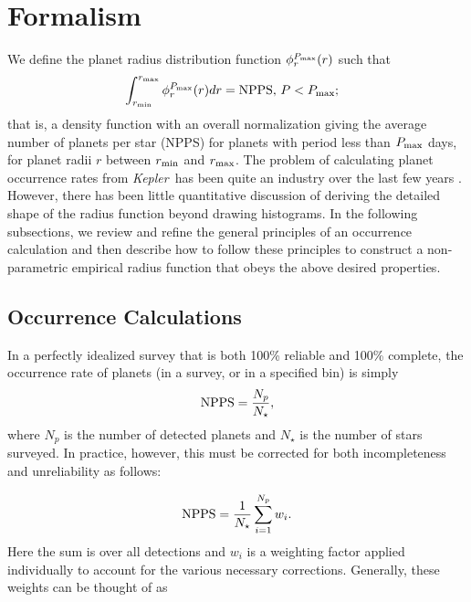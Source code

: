 \documentclass[iop]{emulateapj}
\def\Kepler{\textit{Kepler}}
\begin{document}
\section{Formalism}
\label{sec:formalism}

We define the planet radius distribution function $\phi_r^{P_{\rm max}}(r)$ such that
\begin{eqnarray}
\label{eq:definition}
& \int_{r_{\rm min}}^{r_{\rm max}}  \phi^{P_{\rm max}}_r(r) dr = {\rm NPPS,}  ~P < P_{\rm max};   %
\end{eqnarray}
that is, a density function with an overall normalization giving the average number of planets per star (NPPS) for planets with period less than $P_{\rm max}$ days, for planet radii $r$ between $r_{\rm min}$ and $r_{\rm max}$.  The problem of calculating planet occurrence rates from \Kepler\ has been quite an industry over the last few years \citep{youdin2011,howard2012,dong2012,swift2013,fressin2013,petigura2013,dressing2013}.  However, there has been little quantitative discussion of deriving the detailed shape of the radius function beyond drawing histograms.  In the following subsections, we review and refine the general principles of an occurrence calculation and then describe how to follow these principles to construct a non-parametric empirical radius function that obeys the above desired properties.

\subsection{Occurrence Calculations}
\label{sec:occurrence}
In a perfectly idealized survey that is both 100\% reliable and 100\% complete, the occurrence rate of planets (in a survey, or in a specified bin) is simply 
\begin{equation}
\label{eq:npps}
{\rm NPPS} = \frac{N_p}{N_\star},
\end{equation}  
where $N_p$ is the number of detected planets and $N_\star$ is the number of stars surveyed.  In practice, however, this must be corrected for both incompleteness and unreliability as follows:

\begin{equation}
\label{eq:nppssum}
{\rm NPPS} = \frac{1}{N_{\star}} \sum_{i=1}^{N_p} w_i.
\end{equation} 
Here the sum is over all detections and $w_i$ is a weighting factor applied individually to account for the various necessary corrections.  Generally, these weights can be thought of as 
\end{document}
